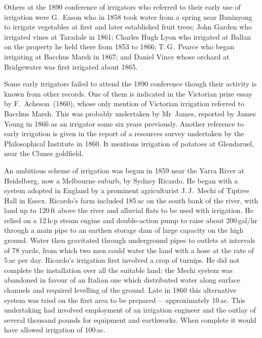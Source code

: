 Others at the 1890 conference of irrigators who referred to their
early use of irrigation were G.~Eason who in 1858 took water from a
spring near Buninyong to irrigate vegetables at first and later
established fruit trees; John Garden who irrigated vines at Taradale
in 1861; Charles Hugh Lyon who irrigated at Ballan on the property he
held there from 1853 to 1866; T.\,G.~Pearce who began irrigating at
Bacchus Marsh in 1867; and Daniel Vince whose orchard at Bridgewater
was first irrigated about 1865.

Some early irrigators failed to attend the 1890 conference though
their activity is known from other records.  One of them is indicated
in the Victorian prize essay by F.~Acheson~(1860), whose only mention
of Victorian irrigation referred to Bacchus Marsh.  This was probably
undertaken by Mr~James, reported by James Young in 1866 as an
irrigator some six years previously.  Another reference to early
irrigation is given in the report of a resources survey undertaken by
the Philosophical Institute in 1860.  It mentions irrigation of
potatoes at Glendaruel, near the Clunes
goldfield.

An ambitious scheme of irrigation was begun in 1859 near the Yarra
River at Heidelberg, now a Melbourne suburb, by Sydney Ricardo.  He
began with a system adopted in England by a prominent agriculturist
J.\,J.~Mechi of Tiptree Hall in Essex.  Ricardo's farm included
185\,ac on the south bank of the river, with land up to 120\,ft above
the river and alluvial flats to be used with irrigation.  He relied on
a 12\,h-p steam engine and double-action pump to raise about
200\,gal/hr through a main pipe to an earthen storage dam of large
capacity on the high ground.  Water then gravitated through
underground pipes to outlets at intervals of 78 yards, from which two
men could water the land with a hose at the rate of 5\,ac per day.
Ricardo's irrigation first involved a crop of turnips.  He did not
complete the installation over all the suitable land: the Mechi system
was abandoned in favour of an Italian one which distributed water
along surface channels and required levelling of the ground.  Late in
1860 this alternative system was tried on the first area to be
prepared\,---\,approximately 10\,ac.  This undertaking had involved
employment of an irrigation engineer and the outlay of several
thousand pounds for equipment and earthworks.  When complete it would
have allowed irrigation of 100\,ac.

